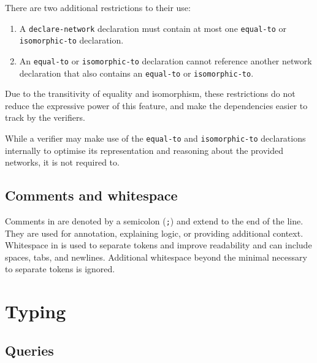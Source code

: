 There are two additional restrictions to their use:
\begin{enumerate}
\item A \texttt{declare-network} declaration must contain at most one \texttt{equal-to} or \texttt{isomorphic-to} declaration.
\item An \texttt{equal-to} or \texttt{isomorphic-to} declaration cannot reference another network declaration that also contains an \texttt{equal-to} or \texttt{isomorphic-to}. 
\end{enumerate}
Due to the transitivity of equality and isomorphism, these restrictions do not reduce the expressive power of this feature, and make the dependencies easier to track by the verifiers.

While a verifier may make use of the \texttt{equal-to} and \texttt{isomorphic-to} declarations internally to optimise its representation and reasoning about the provided networks, it is not required to.



\subsection{Comments and whitespace}

Comments in \vnnlib{} are denoted by a semicolon (\texttt{;}) and extend to the end of the line. They are used for annotation, explaining logic, or providing additional context. Whitespace in \vnnlib{} is used to separate tokens and improve readability and can include spaces, tabs, and newlines. Additional whitespace beyond the minimal necessary to separate tokens is ignored.


\section{Typing}
\label{sec:scoping_and_typing}


\subsection{Queries}
\label{sec:query-typing}

